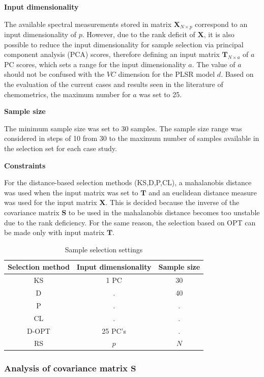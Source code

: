 \documentclass{article}
\begin{document}
\textbf{Input dimensionality}

The available spectral measurements stored in matrix $\mathbf{X}_{N\times p}$ correspond to an input dimensionality of $p$. However, due to the rank deficit of $\mathbf{X}$, it is also possible to reduce the input dimensionality for sample selection via principal component analysis (PCA) scores, therefore defining an input matrix $\mathbf{T}_{N\times a}$ of $a$ PC scores, which sets a range for the input dimensionality $a$. The value of $a$ should not be confused with the $VC$ dimension for the PLSR model $d$. Based on the evaluation of the current cases and results seen in the literature of chemometrics, the maximum number for $a$ was set to 25.

\textbf{Sample size}

The minimum sample size was set to 30 samples. The sample size range was considered in steps of 10 from 30 to the maximum number of samples available in the selection set for each case study. 

\textbf{Constraints}

For the distance-based selection methods (KS,D,P,CL), a mahalanobis distance was used when the input matrix was set to $\mathbf{T}$ and an euclidean distance measure was used for the input matrix $\mathbf{X}$. This is decided because the inverse of the covariance matrix $\mathbf{S}$ to be used in the mahalanobis distance becomes too unstable due to the rank deficiency. For the same reason, the selection based on OPT can be made only with input matrix $\mathbf{T}$. 

\begin{table}[t]
\centering
\begin{tabular}{|c|c|c|} 
\hline
Selection method	& Input dimensionality	& Sample size	\\
\hline

KS & 1 PC   & 30  \\
D &  . & 40\\
P &  . & . \\
CL & . & . \\
D-OPT & 25 PC's & .\\
RS & $p$ & $N$\\
\hline


\end{tabular}
\caption{Sample selection settings}
\label{tab_samplesel_settings_exhaustive_search}
\end{table}

\subsubsection*{Analysis of covariance matrix $\mathbf{S}$}
\end{document}
